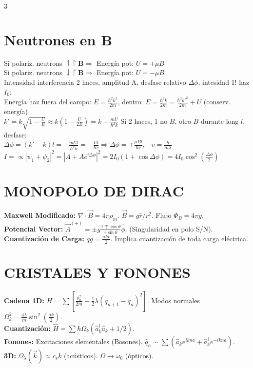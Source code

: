 \documentclass[8pt,a4paper,fleqn]{extarticle} %
\begin{document}
\begin{multicols}{3}
\section*{Neutrones en $\mathbf{B}$}
Si polariz. neutrons $\upharpoonleft \upharpoonright \mathbf{B} \Rightarrow$ Energía pot: $U=+\mu B$\\
Si polariz. neutrons $\downharpoonleft \upharpoonright \mathbf{B} \Rightarrow$ Energía pot: $U=-\mu B$\\
Intensidad interferencia 2 haces, amplitud A, desfase relativo $\Delta\phi$, intesidad 1! haz $I_0$:\\
Energía haz fuera del campo: $E=\frac{\hbar^2 k^2}{2m}$, dentro: $E=\frac{\hbar^2 k}{2m} = \frac{\hbar^2 k'^2}{2m}+U$ (conserv. energía)\\
$k' = k \sqrt{1-\frac{U}{E}}\approx k(1-\tfrac{U}{2E})= k - \frac{mU}{\hbar^2 k}$ Si 2 haces, 1 no $B$, otro $B$ durante long $l$, desfase:\\
$\Delta \phi = (k' - k)l = -\frac{m U l}{\hbar^2 k} = -\frac{U l}{\hbar v} \Rightarrow\Delta\phi = \mp \frac{\mu B l}{\hbar v},\;\;\;v = \frac{h}{m\lambda}$
\\
$I=\propto |\psi_1 + \psi_2|^2 = |A + A e^{i\Delta \phi}|^2 = 2 I_0 (1 + \cos \Delta \phi) = 4 I_0 \cos^2 \left( \frac{\Delta \phi}{2} \right)$



\section{MONOPOLO DE DIRAC}
\textbf{Maxwell Modificado:} $\nabla \cdot \vec{B} = 4\pi \rho_m$. $\vec{B} = g \hat{r}/r^2$. Flujo $\Phi_B = 4\pi g$.\\
\textbf{Potencial Vector:} $\vec{A}^{(\pm)} = \pm g \frac{1 \mp \cos\theta}{r \sin\theta} \hat{\phi}$. (Singularidad en polo S/N).\\
\textbf{Cuantización de Carga:} $qg = \frac{n \hbar c}{2}$. Implica cuantización de toda carga eléctrica.

\section{CRISTALES Y FONONES}
\textbf{Cadena 1D:} $H = \sum [ \frac{p_n^2}{2m} + \frac{1}{2}\lambda (q_{n+1}-q_n)^2 ]$. Modos normales $\Omega_k^2 = \frac{4\lambda}{m} \sin^2(\frac{ak}{2})$.\\
\textbf{Cuantización:} $\hat{H} = \sum \hbar \Omega_k (\hat{a}_k^\dagger \hat{a}_k + 1/2)$.\\
\textbf{Fonones:} Excitaciones elementales (Bosones). $\hat{q}_n \sim \sum (\hat{a}_k e^{ikna} + \hat{a}_k^\dagger e^{-ikna})$.\\
\textbf{3D:} $\Omega_\lambda(\vec{k}) \approx c_s k$ (acústicos). $\Omega \to \omega_0$ (ópticos).


\end{multicols}
\end{document}
